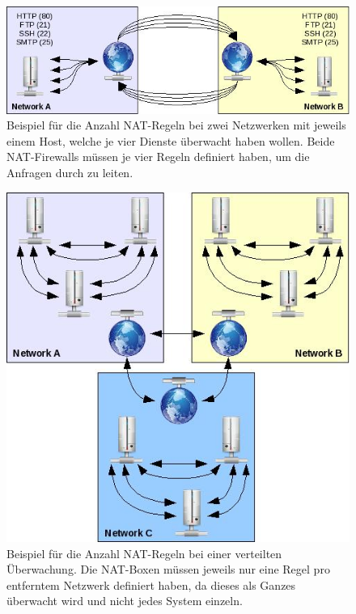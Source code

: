 
\begin{figure}[H]
  \centering
  \includegraphics[width=0.6\linewidth]{images/theorie/nat-source}
  \caption[Anzahl NAT-Regeln bei zwei Netzwerken]{Beispiel f\"ur die Anzahl NAT-Regeln bei zwei Netzwerken mit jeweils einem Host, welche je vier Dienste \"uberwacht haben wollen. Beide NAT-Firewalls m\"ussen je vier Regeln definiert haben, um die Anfragen durch zu leiten.}
  \label{fig:nat-source}
\end{figure}

\begin{figure}[H]
  \centering
  \includegraphics[width=0.6\linewidth]{images/theorie/nat-verteilt}
  \caption[Anzahl NAT-Regeln bei einer verteilten \"Uberwachung]{Beispiel f\"ur die Anzahl NAT-Regeln bei einer verteilten \"Uberwachung. Die NAT-Boxen m\"ussen jeweils nur eine Regel pro entferntem Netzwerk definiert haben, da dieses als Ganzes \"uberwacht wird und nicht jedes System einzeln.}
  \label{fig:nat-verteilt}
\end{figure}


